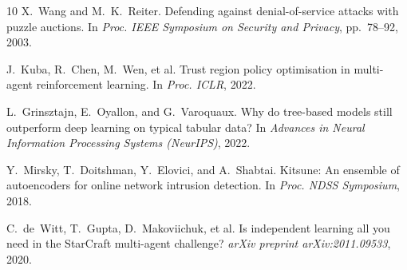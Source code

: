 \documentclass[sigconf,nonacm]{acmart}
\begin{document}
\begin{thebibliography}{10}
X.~Wang and M.~K.~Reiter.
\newblock Defending against denial-of-service attacks with puzzle auctions.
\newblock In \emph{Proc. IEEE Symposium on Security and Privacy}, pp.~78--92, 2003.

J.~Kuba, R.~Chen, M.~Wen, et al.
\newblock Trust region policy optimisation in multi-agent reinforcement learning.
\newblock In \emph{Proc. ICLR}, 2022.

L.~Grinsztajn, E.~Oyallon, and G.~Varoquaux.
\newblock Why do tree-based models still outperform deep learning on typical tabular data?
\newblock In \emph{Advances in Neural Information Processing Systems (NeurIPS)}, 2022.

Y.~Mirsky, T.~Doitshman, Y.~Elovici, and A.~Shabtai.
\newblock Kitsune: An ensemble of autoencoders for online network intrusion detection.
\newblock In \emph{Proc. NDSS Symposium}, 2018.

C.~de~Witt, T.~Gupta, D.~Makoviichuk, et al.
\newblock Is independent learning all you need in the {StarCraft} multi-agent challenge?
\newblock \emph{arXiv preprint arXiv:2011.09533}, 2020.

\end{thebibliography}
\end{document}
